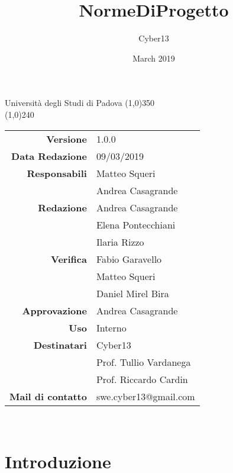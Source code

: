 \documentclass[a4paper, 12pt]{article}
\title{NormeDiProgetto}
\author{Cyber13}
\date{March 2019}
\begin{document}
	\begin{titlepage}
		\centering Università degli Studi di Padova
		\line(1,0){350}\\
		\vspace{1.2cm}
		\logo
		\vspace{1.0cm}
		\vspace{0.5cm}
		\vspace{0.5cm}
		\line(1,0){240}\\
		\begin{tabular}{r|l}
			{\textbf{Versione}} 			& 1.0.0\\
			{\textbf{Data Redazione}} 	& 09/03/2019\\	%
			{\textbf{Responsabili}} 	& Matteo Squeri \\ & Andrea Casagrande \\	%
			{\textbf{Redazione}} 		 & Andrea Casagrande \\& Elena Pontecchiani \\ & Ilaria Rizzo \\ 
			{\textbf{Verifica}} 			& Fabio Garavello \\ & Matteo Squeri\\  & Daniel Mirel Bira\\ 
			{\textbf{Approvazione}} 		& Andrea Casagrande\\
			{\textbf{Uso}} 				& Interno\\
			{\textbf{Destinatari}} 	& Cyber13\\ & Prof. Tullio Vardanega\\ & Prof. Riccardo Cardin\\
			{\textbf{Mail di contatto}} 	& swe.cyber13@gmail.com\\
		\end{tabular}\\
	\end{titlepage}

	\newpage
		
	\newpage
		\tableofcontents
        	\newpage
	    	\listoffigures
	    	\newpage
        	\section{Introduzione}
                
                \newpage
\end{document}
